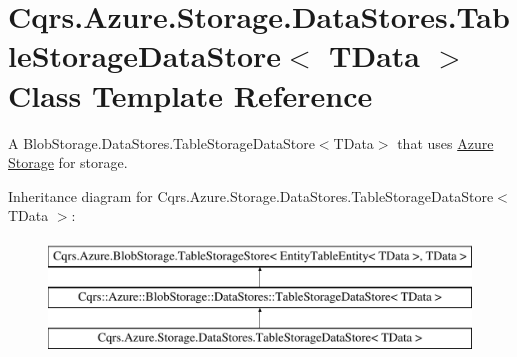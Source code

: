 \hypertarget{classCqrs_1_1Azure_1_1Storage_1_1DataStores_1_1TableStorageDataStore}{}\section{Cqrs.\+Azure.\+Storage.\+Data\+Stores.\+Table\+Storage\+Data\+Store$<$ T\+Data $>$ Class Template Reference}
\label{classCqrs_1_1Azure_1_1Storage_1_1DataStores_1_1TableStorageDataStore}


A Blob\+Storage.\+Data\+Stores.\+Table\+Storage\+Data\+Store$<$\+T\+Data$>$ that uses \hyperlink{namespaceCqrs_1_1Azure}{Azure} \hyperlink{namespaceCqrs_1_1Azure_1_1Storage}{Storage} for storage.  


Inheritance diagram for Cqrs.\+Azure.\+Storage.\+Data\+Stores.\+Table\+Storage\+Data\+Store$<$ T\+Data $>$\+:\begin{figure}[H]
\begin{center}
\leavevmode
\includegraphics[height=3.000000cm]{classCqrs_1_1Azure_1_1Storage_1_1DataStores_1_1TableStorageDataStore}
\end{center}
\end{figure}
